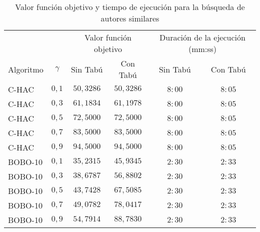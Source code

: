 \begin{table}[H]
	\centering
	\resizebox{.4\textwidth}{!} {
		\begin{tabular}{|lc|cccc|}
			\hline
			~  & ~ & \multicolumn{2}{|c}{Valor función objetivo} & \multicolumn{2}{c|}{Duración de la ejecución (mm:ss)} \\
			Algoritmo & $\gamma$ & Sin Tabú & Con Tabú & Sin Tabú & Con Tabú \\ 
			\hline
			C-HAC & $0,1$ & $50,3286$  & $50,3286$ & $8:00$ & $8:05$ \\
			C-HAC & $0,3$ & $61,1834$  & $61,1978$ & $8:00$ & $8:05$ \\
			C-HAC & $0,5$ & $72,5000$  & $72,5000$ & $8:00$ & $8:05$ \\
			C-HAC & $0,7$ & $83,5000$  & $83,5000$ & $8:00$ & $8:05$ \\
			C-HAC & $0,9$ & $94,5000$  & $94,5000$ & $8:00$ & $8:05$ \\
			BOBO-10 & $0,1$ & $35,2315$  & $45,9345$ & $2:30$ & $2:33$ \\
			BOBO-10 & $0,3$ & $38,6787$  & $56,8802$ & $2:30$ & $2:33$ \\
			BOBO-10 & $0,5$ & $43,7428$  & $67,5085$ & $2:30$ & $2:33$ \\
			BOBO-10 & $0,7$ & $49,0782$  & $78,0417$ & $2:30$ & $2:33$ \\
			BOBO-10 & $0,9$ & $54,7914$  & $88,7830$ & $2:30$ & $2:33$ \\
			\hline
		\end{tabular}
	}
	\caption {Valor función objetivo y tiempo de ejecución para la búsqueda de autores similares}
\end{table}